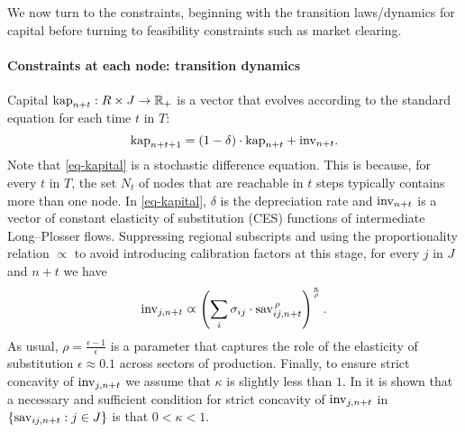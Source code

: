 \documentclass[12pt,a4paper,twoside, draft]{article}
\newcommand{\mrpropto}{\mathrel{\varpropto}}
\begin{document}
We now turn to the constraints, beginning with the transition laws/dynamics for
capital before turning to feasibility constraints such as market clearing.
\paragraph{Constraints at each node: transition dynamics}
Capital $\textup{kap}_{n + t}: R \times J \rightarrow \mathbb R_+$ is a vector that
evolves according to the standard equation for each time $t$ in $T$:
\begin{equation}\label{eq-kapital}
   \textup{kap}_{n + t + 1} = (1 - \delta) \cdot \textup{kap}_{n + t} +
   \textup{inv}_{n + t}.
\end{equation}
Note that \eqref{eq-kapital} is a stochastic difference equation.
This is because, for every $t$ in $T$, the set $N_t$ of nodes that are
reachable in $t$ steps typically contains more than one node.
In \eqref{eq-kapital}, $\delta$ is the depreciation rate and
$\textup{inv}_{n + t}$ is a vector of constant elasticity of substitution (CES)
functions of intermediate Long--Plosser flows.
Suppressing regional subscripts and using the proportionality relation
$\mrpropto$ to avoid introducing calibration factors at this stage,
for every $j$ in $J$ and $n + t$ we have
\begin{equation}\label{eq-ces-inv}
    \textup{inv}_{j, n + t} \mrpropto \left(
        \sum_{i} \sigma_{i j} \cdot \textup{sav}_{i j, n + t} ^ {\,\rho}
      \right)
      ^ {\frac{\kappa}{\rho}}.
\end{equation}
As usual, $\rho = \frac{\epsilon - 1}{\epsilon}$ is a parameter that
captures the role of the elasticity of substitution $\epsilon \approx
0.1$ across sectors of production. Finally, to ensure strict concavity
of $\textup{inv}_{j, n + t}$ we assume that $\kappa$ is slightly less than $1$.
In \citet[Theorem 2]{Kojic-Concavity} it is shown that a necessary and
sufficient condition for strict concavity of $\textup{inv}_{j, n + t}$ in 
$\left\{\textup{sav}_{ij, n + t}: j \in J\right\}$ is that $0< \kappa < 1$.
\end{document}

